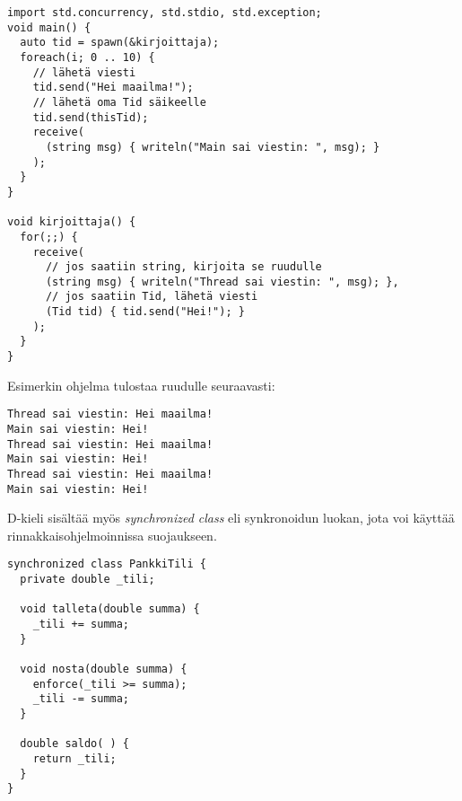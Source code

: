 \documentclass[11pt,oneside,a4paper]{article}
\begin{document}
\begin{verbatim}
import std.concurrency, std.stdio, std.exception;
void main() {
  auto tid = spawn(&kirjoittaja);
  foreach(i; 0 .. 10) {
    // lähetä viesti
    tid.send("Hei maailma!");
    // lähetä oma Tid säikeelle
    tid.send(thisTid);
    receive(
      (string msg) { writeln("Main sai viestin: ", msg); }
    );
  }
}

void kirjoittaja() {
  for(;;) {
    receive(
      // jos saatiin string, kirjoita se ruudulle
      (string msg) { writeln("Thread sai viestin: ", msg); }, 
      // jos saatiin Tid, lähetä viesti
      (Tid tid) { tid.send("Hei!"); }
    );
  }
}

\end{verbatim}

Esimerkin ohjelma tulostaa ruudulle seuraavasti:

\begin{verbatim}
Thread sai viestin: Hei maailma!
Main sai viestin: Hei!
Thread sai viestin: Hei maailma!
Main sai viestin: Hei!
Thread sai viestin: Hei maailma!
Main sai viestin: Hei!
\end{verbatim}

D-kieli sisältää myös \textit{synchronized class} eli synkronoidun luokan, jota voi käyttää rinnakkaisohjelmoinnissa suojaukseen.
\begin{verbatim}
synchronized class PankkiTili {
  private double _tili;

  void talleta(double summa) {
    _tili += summa;
  }

  void nosta(double summa) {
    enforce(_tili >= summa);
    _tili -= summa;
  }

  double saldo( ) {
    return _tili;
  }
}
\end{verbatim}
\end{document}
